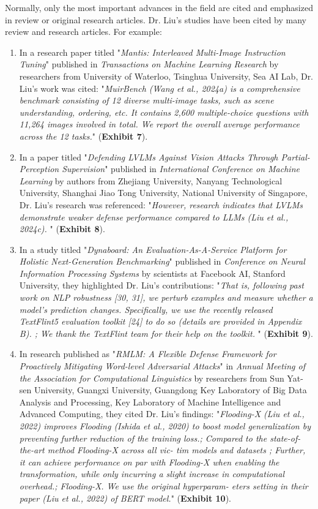 \documentclass{article}
\begin{document}
Normally, only the most important advances in the field are cited and emphasized in review or original research articles. Dr. Liu's studies have been cited by many review and research articles. For example:
\begin{enumerate}[label=• ]
    \item In a research paper titled "\textit{Mantis: Interleaved Multi-Image Instruction Tuning}" published in \textit{Transactions on Machine Learning Research} by researchers from University of Waterloo, Tsinghua University, Sea AI Lab, Dr. Liu's work was cited: "\textit{MuirBench (Wang et al., 2024a) is a comprehensive benchmark consisting of 12 diverse multi-image tasks, such as scene understanding, ordering, etc. It contains 2,600 multiple-choice questions with 11,264 images involved in total. We report the overall average performance across the 12 tasks.}" (\textbf{Exhibit 7}).

    \item In a paper titled "\textit{Defending LVLMs Against Vision Attacks Through Partial-Perception Supervision}" published in \textit{International Conference on Machine Learning} by authors from Zhejiang University, Nanyang Technological University, Shanghai Jiao Tong University, National University of Singapore, Dr. Liu's research was referenced: "\textit{However, research indicates that LVLMs demonstrate weaker defense performance compared to LLMs (Liu et al., 2024c). }" (\textbf{Exhibit 8}).

    \item In a study titled "\textit{Dynaboard: An Evaluation-As-A-Service Platform for Holistic Next-Generation Benchmarking}" published in \textit{Conference on Neural Information Processing Systems} by scientists at Facebook AI, Stanford University, they highlighted Dr. Liu's contributions: "\textit{That is, following past work on NLP robustness [30, 31], we perturb examples and measure whether a model’s prediction changes. Specifically, we use the recently released TextFlint5 evaluation toolkit [24] to do so (details are provided in Appendix B). ; We thank the TextFlint team for their help on the toolkit. }" (\textbf{Exhibit 9}).

    \item In research published as "\textit{RMLM: A Flexible Defense Framework for Proactively Mitigating Word-level Adversarial Attacks}" in \textit{Annual Meeting of the Association for Computational Linguistics} by researchers from Sun Yat-sen University, Guangxi University, Guangdong Key Laboratory of Big Data Analysis and Processing, Key Laboratory of Machine Intelligence and Advanced Computing, they cited Dr. Liu's findings: "\textit{Flooding-X (Liu et al., 2022) improves Flooding (Ishida et al., 2020) to boost model generalization by preventing further reduction of the training loss.; Compared to the state-of-the-art method Flooding-X across all vic- tim models and datasets ; Further, it can achieve performance on par with Flooding-X when enabling the transformation, while only incurring a slight increase in computational overhead.; Flooding-X. We use the original hyperparam- eters setting in their paper (Liu et al., 2022) of BERT model.}" (\textbf{Exhibit 10}).


\end{enumerate}
\end{document}
